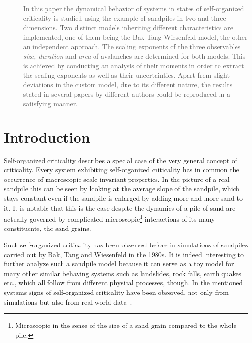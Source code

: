 \begin{abstract}
In this paper the dynamical behavior of systems in states of self-organized criticality is studied using the example
of sandpiles in two and three dimensions. Two distinct models inheriting different characteristics are implemented,
one of them being the Bak-Tang-Wiesenfeld model, the other an independent approach.
The scaling exponents of the three observables \textit{size, duration} and \textit{area} of avalanches are determined
for both models. This is achieved by conducting an analysis of their moments in order to extract the scaling exponents
as well as their uncertainties. Apart from slight deviations in the custom model, due to its different nature,
the results stated in several papers by different authors could be reproduced in a satisfying manner.
\end{abstract}

\maketitle

\section{Introduction}
\label{sec:intro}

Self-organized criticality describes a special case of the very general concept of criticality. Every system
exhibiting self-organized criticality has in common the occurrence of macroscopic scale invariant properties.
In the picture of a real sandpile this can be seen by looking at the average slope of the sandpile,
which stays constant even if the sandpile is enlarged by adding more and more sand to it.
It is notable that this is the case despite the dynamics of a pile of sand are actually governed by complicated
microscopic\footnote{Microscopic in the sense of the size of a sand grain compared to the whole pile.} interactions
of its many constituents, the sand grains.

Such self-organized criticality has been observed before in simulations of sandpiles carried out by Bak, Tang and
Wiesenfeld in the 1980s. It is indeed interesting to further analyze such a sandpile model
because it can serve as a toy model for many other similar behaving systems such as landslides, rock falls, earth quakes
etc., which all follow from different physical processes, though.
In the mentioned systems signs of self-organized criticality have been observed, not only from simulations but also
from real-world data~\cite{Hergarten}.

